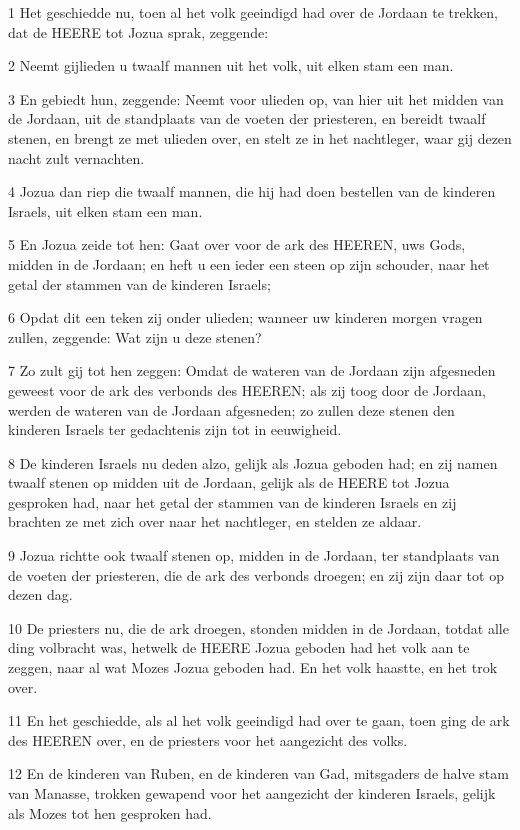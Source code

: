 \par 1 Het geschiedde nu, toen al het volk geeindigd had over de Jordaan te trekken, dat de HEERE tot Jozua sprak, zeggende:
\par 2 Neemt gijlieden u twaalf mannen uit het volk, uit elken stam een man.
\par 3 En gebiedt hun, zeggende: Neemt voor ulieden op, van hier uit het midden van de Jordaan, uit de standplaats van de voeten der priesteren, en bereidt twaalf stenen, en brengt ze met ulieden over, en stelt ze in het nachtleger, waar gij dezen nacht zult vernachten.
\par 4 Jozua dan riep die twaalf mannen, die hij had doen bestellen van de kinderen Israels, uit elken stam een man.
\par 5 En Jozua zeide tot hen: Gaat over voor de ark des HEEREN, uws Gods, midden in de Jordaan; en heft u een ieder een steen op zijn schouder, naar het getal der stammen van de kinderen Israels;
\par 6 Opdat dit een teken zij onder ulieden; wanneer uw kinderen morgen vragen zullen, zeggende: Wat zijn u deze stenen?
\par 7 Zo zult gij tot hen zeggen: Omdat de wateren van de Jordaan zijn afgesneden geweest voor de ark des verbonds des HEEREN; als zij toog door de Jordaan, werden de wateren van de Jordaan afgesneden; zo zullen deze stenen den kinderen Israels ter gedachtenis zijn tot in eeuwigheid.
\par 8 De kinderen Israels nu deden alzo, gelijk als Jozua geboden had; en zij namen twaalf stenen op midden uit de Jordaan, gelijk als de HEERE tot Jozua gesproken had, naar het getal der stammen van de kinderen Israels en zij brachten ze met zich over naar het nachtleger, en stelden ze aldaar.
\par 9 Jozua richtte ook twaalf stenen op, midden in de Jordaan, ter standplaats van de voeten der priesteren, die de ark des verbonds droegen; en zij zijn daar tot op dezen dag.
\par 10 De priesters nu, die de ark droegen, stonden midden in de Jordaan, totdat alle ding volbracht was, hetwelk de HEERE Jozua geboden had het volk aan te zeggen, naar al wat Mozes Jozua geboden had. En het volk haastte, en het trok over.
\par 11 En het geschiedde, als al het volk geeindigd had over te gaan, toen ging de ark des HEEREN over, en de priesters voor het aangezicht des volks.
\par 12 En de kinderen van Ruben, en de kinderen van Gad, mitsgaders de halve stam van Manasse, trokken gewapend voor het aangezicht der kinderen Israels, gelijk als Mozes tot hen gesproken had.
